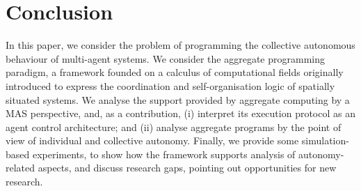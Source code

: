 \section{Conclusion} %
\label{s:conc}

In this paper, we consider the problem
 of programming the collective autonomous behaviour
 of multi-agent systems.
%
We consider the aggregate programming paradigm, 
 a framework
 founded on a calculus of computational fields
 originally introduced 
 to express the coordination 
 and self-organisation logic of spatially situated systems.
%
We analyse the support provided by aggregate computing
 by a MAS perspective,
 and, as a contribution, 
 (i) interpret its execution protocol as an agent control architecture; and
 (ii) analyse aggregate programs by the point of view of individual and collective autonomy.
%
Finally, 
 we provide some simulation-based experiments,
 to show how the framework supports
 analysis of autonomy-related aspects,
 and discuss research gaps,
 pointing out opportunities for new research.

